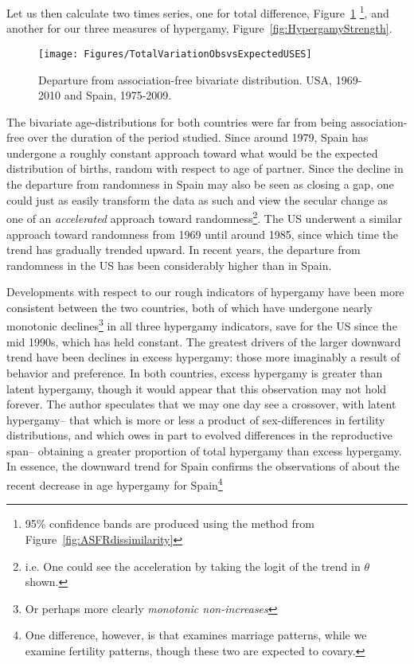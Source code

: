 Let us then calculate two times series, one for total difference,
Figure~\ref{fig:Theta} \footnote{95\% confidence bands are produced
    using the method from Figure~\ref{fig:ASFRdissimilarity}}, and another for
    our three measures of hypergamy, Figure~\ref{fig:HypergamyStrength}.
\begin{figure}[!ht]
  \centering
    \caption{Departure from association-free bivariate distribution. USA,
    1969-2010 and Spain, 1975-2009.}
     \texttt{[image: Figures/TotalVariationObsvsExpectedUSES]}
     \label{fig:Theta}
\end{figure}
The bivariate age-distributions for both countries were far from being
association-free over the duration of the period studied. Since around
1979, Spain has undergone a roughly constant approach toward what would be the
expected distribution of births, random with respect to age of
partner. Since the decline in the departure from randomness in Spain 
may also be seen as closing a gap, one could just as
easily transform the data as such and view the secular change as one of an
\textit{accelerated} approach toward randomness\footnote{i.e. One could see the
acceleration by taking the logit of the trend in $\theta$ shown.}. The US
underwent a similar approach toward randomness from 1969 until around 1985,
since which time the trend has gradually trended upward. In recent years, the
departure from randomness in the US has been considerably higher than in Spain.

Developments with respect to our rough indicators of hypergamy have been more
consistent between the two countries, both of which have undergone nearly
monotonic declines\footnote{Or perhaps more clearly \textit{monotonic
non-increases}} in all three hypergamy indicators, save for the US since the mid
1990s, which has held constant. The greatest drivers of the larger downward trend
have been declines in excess hypergamy: those more imaginably a result of
behavior and preference. In both countries, excess hypergamy is greater than
latent hypergamy, though it would appear that this observation may not hold forever. The author
 speculates that we may one day see a crossover, with latent hypergamy-- that
which is more or less a product of sex-differences in fertility distributions,
and which owes in part to evolved differences in the reproductive span-- obtaining a
greater proportion of total hypergamy than excess hypergamy. In essence, the
downward trend for Spain confirms the observations of \citet{esteve2009long}
about the recent decrease in age hypergamy for Spain\footnote{One difference,
however, is that \citet{esteve2009long} examines marriage patterns, while we
examine fertility patterns, though these two are expected to covary.}

